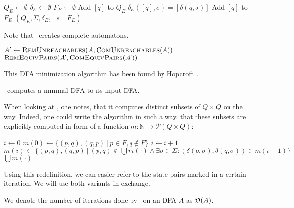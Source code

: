\begin{enumerate}
	\vspace{0.2cm}
	\begin{algorithmic}[1] \label{ch:2:minmerge}
            \State $Q_E \gets \emptyset$
            \State $\delta_E \gets \emptyset$
            \State $F_E \gets \emptyset$
                \State Add $[q]$ to $Q_E$ 
                    \State $\delta_E([q], \sigma) = [\delta(q, \sigma)]$
                \EndFor
                    \State Add $[q]$ to $F_E$
                \EndIf
            \EndFor
			\State \Return $(Q_E, \Sigma, \delta_E, [s], F_E)$
		\EndFunction
	\end{algorithmic}
	Note that \RemEq\ creates complete automatons.
\end{enumerate}

\vspace{0.2cm}
\begin{algorithmic}[1] \label{ch:2:minalg}
    \State $A' \gets \textsc{RemUnreachables}(A, \textsc{ComUnreachables}(A))$
    \State \Return $\textsc{RemEquivPairs}(A', \textsc{ComEquivPairs}(A'))$
    \EndFunction
\end{algorithmic}
\vspace{0.2cm}
\noindent This DFA minimization algorithm has been found by Hopcroft~\cite{Hop71}.

\begin{theorem}\label{ch:2:min-alg-correct}\textnormal{\cite[pp. 162-164]{HMU01}}
	\MinAlg\ computes a minimal DFA to its input DFA.
\end{theorem}

\noindent When looking at \CompDist, one notes, that it computes distinct subsets of $Q \times Q$ on the way. Indeed, one could write the algorithm in such a way, that these subsets are explicitly computed in form of a function $m\colon\mathbb{N}\to\mathcal{P}(Q\times Q)$:
\vspace{0.2cm}
\begin{algorithmic}[1] \label{ch:2:m-minmark}
	\State $i \gets 0$
	\State $m(0) \gets \{ (p,q), (q,p)\ |\ p \in F, q \notin F \}$
	\Do
		\State $i \gets i + 1$
		\State $m(i) \gets \{ (p,q), (q,p)\ |\ (p,q) \notin \bigcup{m(\cdot)} \land \exists \sigma \in \Sigma \colon (\delta(p,\sigma), \delta(q,\sigma)) \in m(i-1) \}$
	\State \Return $\bigcup{m(\cdot)}$
	\EndFunction
\end{algorithmic}
\vspace{0.2cm}
Using this redefinition, we can easier refer to the state pairs marked in a certain iteration. We will use both variants in exchange.
\begin{definition}\label{ch:2:def:D(A)}
	We denote the number of iterations done by \CompDist\ on an DFA $A$ as $\mathfrak{D}(A)$.
\end{definition}

